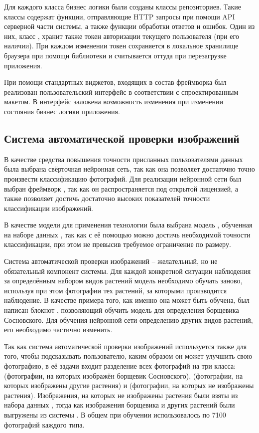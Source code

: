 \tab
Для каждого класса бизнес логики были созданы классы репозиториев.
Такие классы содержат функции, отправляющие HTTP запросы при помощи API серверной части системы, а также функции обработки ответов и ошибок.
Один из них, класс , хранит также токен авторизации текущего пользователя (при его наличии).
При каждом изменении токен сохраняется в локальное хранилище браузера при помощи библиотеки  и считывается оттуда при перезагрузке приложения.

\tab
При помощи стандартных виджетов, входящих в состав фреймворка  был реализован пользовательский интерфейс в соответствии с спроектированным макетом.
В интерфейс заложена возможность изменения при изменении состояния бизнес логики приложения.

\subsection{Система автоматической проверки изображений}

\tab
В качестве средства повышения точности присланных пользователями данных была выбрана свёрточная нейронная сеть\cite{convolutional-better}, так как она позволяет достаточно точно произвести классификацию фотографий.
Для реализации нейронной сети был выбран фреймворк \cite{tensorflow-better}, так как он распространяется под открытой лицензией, а также позволяет достичь достаточно высоких показателей точности классификации изображений.

\tab
В качестве модели для применения технологии  была выбрана модель \cite{xception-better}, обученная на наборе данных , так как с её помощью можно достичь необходимой точности классификации, при этом не превысив требуемое ограничение по размеру.

\tab
Система автоматической проверки изображений -- желательный, но не обязательный компонент системы.
Для каждой конкретной ситуации наблюдения за определённым набором видов растений модель необходимо обучать заново, используя при этом фотографии тех растений, за которыми производится наблюдение.
В качестве примера того, как именно она может быть обучена, был написан блокнот , позволяющий обучить модель для определения борщевика Сосновского.
Для обучения нейронной сети определению других видов растений, его необходимо частично изменить. 

\tab
Так как система автоматической проверки изображений используется также для того, чтобы подсказывать пользователю, каким образом он может улучшить свою фотографию, в её задачи входит разделение всех фотографий на три класса:  (фотографии, на которых изображён борщевик Сосновского),  (фотографии, на которых изображены другие растения) и  (фотографии, на которых не изображены растения).
Изображения, на которых не изображены растения были взяты из набора данных \cite{???}, тогда как изображения борщевика и других растений были выгружены из системы \cite{inaturalist}.
В общем при обучении использовалось по 7100 фотографий каждого типа.

